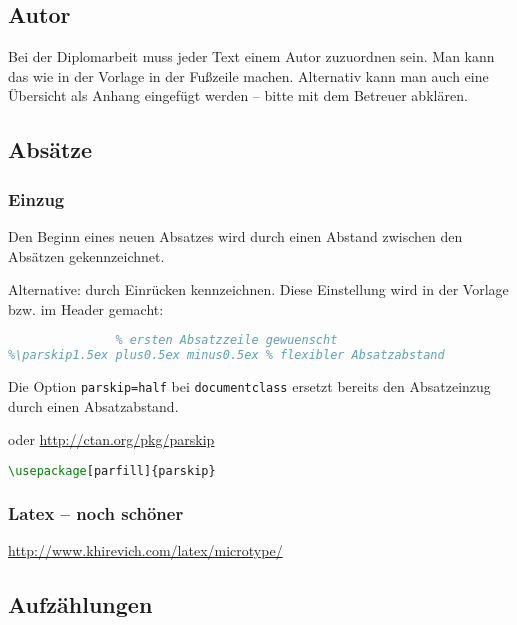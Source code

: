 \hypertarget{autor}{%
\subsection{Autor}\label{autor}}

Bei der Diplomarbeit muss jeder Text einem Autor zuzuordnen sein. Man
kann das wie in der Vorlage in der Fußzeile machen. Alternativ kann man
auch eine Übersicht als Anhang eingefügt werden -- bitte mit dem
Betreuer abklären.

\hypertarget{absuxe4tze}{%
\subsection{Absätze}\label{absuxe4tze}}

\hypertarget{einzug}{%
\subsubsection{Einzug}\label{einzug}}

Den Beginn eines neuen Absatzes wird durch einen Abstand zwischen den
Absätzen gekennzeichnet.

Alternative: durch Einrücken kennzeichnen. Diese Einstellung wird in der
Vorlage bzw. im Header gemacht:

\begin{lstlisting}[language=TeX]
%\parindent0pt % auskommentieren, wenn keine Einrueckung der 
               % ersten Absatzzeile gewuenscht
%\parskip1.5ex plus0.5ex minus0.5ex % flexibler Absatzabstand
\end{lstlisting}

Die Option \passthrough{\lstinline!parskip=half!} bei
\passthrough{\lstinline!documentclass!} ersetzt bereits den Absatzeinzug
durch einen Absatzabstand.

oder \url{http://ctan.org/pkg/parskip}

\begin{lstlisting}[language=TeX]
\usepackage[parfill]{parskip}
\end{lstlisting}

\hypertarget{latex-noch-schuxf6ner}{%
\subsubsection{Latex -- noch schöner}\label{latex-noch-schuxf6ner}}

\url{http://www.khirevich.com/latex/microtype/}

\hypertarget{aufzuxe4hlungen}{%
\subsection{Aufzählungen}\label{aufzuxe4hlungen}}

